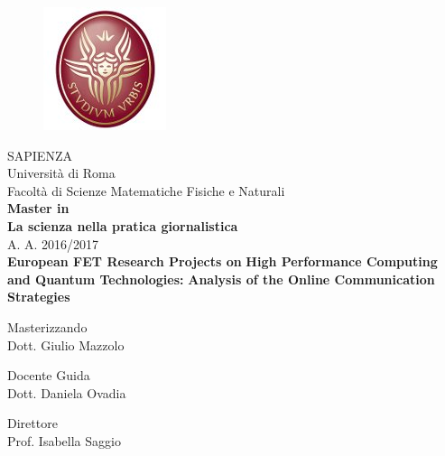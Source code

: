 \begin{titlepage}
 
 \begin{figure}[!t] 
   \begin{center}
   \includegraphics[scale=0.3]{Images/Logo_sapienza.jpg}
   \end{center}
 \end{figure}  
 
 \begin{center}
   SAPIENZA \\
   Universit\`a di Roma \\
   Facolt\`a di Scienze Matematiche Fisiche e Naturali \\
   \vspace{10mm}
   \textbf{Master in} \\
   \textbf{La scienza nella pratica giornalistica}\\
   A. A. 2016/2017 \\
   \vspace{10mm}
   \textbf{European FET Research Projects on}
   \textbf{High Performance Computing and Quantum Technologies:}
   \textbf{Analysis of the Online Communication Strategies}\\
 \end{center} 

 \vspace{10mm}

 \begin{center}
   Masterizzando\\
   Dott. Giulio Mazzolo
 \end{center}

 \vspace{10mm}

 \begin{flushleft}
   Docente Guida\\ 
   Dott. Daniela Ovadia
 \end{flushleft}
 
 \begin{flushright}
   Direttore \, \, \, \, \, \, \\ 
   Prof. Isabella Saggio
 \end{flushright}
 
 \newpage
 \thispagestyle{empty} 
 


\end{titlepage}

